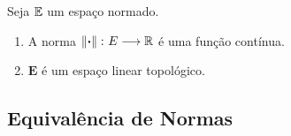 \begin{prop}
Seja $\mathbb{E}$ um espaço normado.
	\begin{enumerate}
	\item A norma $\left\Vert{\bm{\cdot}}\right\Vert\colon E \longrightarrow \mathbb{R}$ é uma função contínua.
	\item $\bm E$ é um espaço linear topológico.
	\end{enumerate}
\end{prop}
%	

\subsection{Equivalência de Normas}




